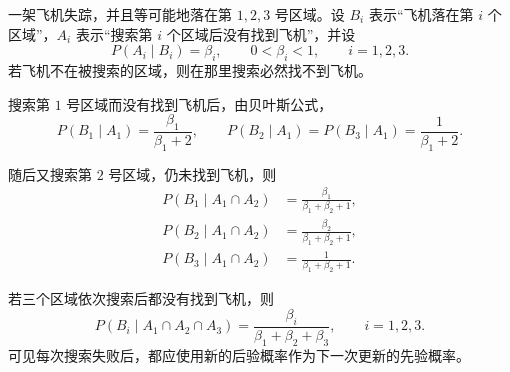 \begin{example}[飞机失事搜索]
一架飞机失踪，并且等可能地落在第 $1,2,3$ 号区域。设 $B_i$ 表示“飞机落在第 $i$ 个区域”，$A_i$ 表示“搜索第 $i$ 个区域后没有找到飞机”，并设
\[
P(A_i\mid B_i)=\beta_i,
\qquad 0<\beta_i<1,
\qquad i=1,2,3.
\]
若飞机不在被搜索的区域，则在那里搜索必然找不到飞机。

搜索第 $1$ 号区域而没有找到飞机后，由贝叶斯公式，
\[
P(B_1\mid A_1)=\frac{\beta_1}{\beta_1+2},
\qquad
P(B_2\mid A_1)=P(B_3\mid A_1)=\frac{1}{\beta_1+2}.
\]

随后又搜索第 $2$ 号区域，仍未找到飞机，则
\[
\begin{aligned}
P(B_1\mid A_1\cap A_2)&=\frac{\beta_1}{\beta_1+\beta_2+1},\\
P(B_2\mid A_1\cap A_2)&=\frac{\beta_2}{\beta_1+\beta_2+1},\\
P(B_3\mid A_1\cap A_2)&=\frac{1}{\beta_1+\beta_2+1}.
\end{aligned}
\]

若三个区域依次搜索后都没有找到飞机，则
\[
P(B_i\mid A_1\cap A_2\cap A_3)
=\frac{\beta_i}{\beta_1+\beta_2+\beta_3},
\qquad i=1,2,3.
\]
可见每次搜索失败后，都应使用新的后验概率作为下一次更新的先验概率。
\end{example}

